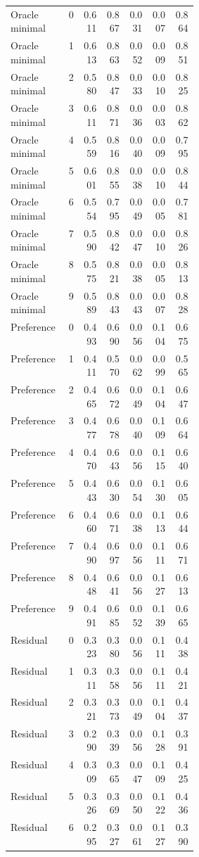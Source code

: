 \documentclass{article}
\begin{document}
\begin{center}
\begin{longtable}{p{0.31\linewidth}rrrrrr}
Oracle minimal & 0 & 0.611 & 0.867 & 0.031 & 0.007 & 0.864\\
Oracle minimal & 1 & 0.613 & 0.863 & 0.052 & 0.009 & 0.851\\
Oracle minimal & 2 & 0.580 & 0.847 & 0.033 & 0.010 & 0.825\\
Oracle minimal & 3 & 0.611 & 0.871 & 0.036 & 0.003 & 0.862\\
Oracle minimal & 4 & 0.559 & 0.816 & 0.040 & 0.009 & 0.795\\
Oracle minimal & 5 & 0.601 & 0.855 & 0.038 & 0.010 & 0.844\\
Oracle minimal & 6 & 0.554 & 0.795 & 0.049 & 0.005 & 0.781\\
Oracle minimal & 7 & 0.590 & 0.842 & 0.047 & 0.010 & 0.826\\
Oracle minimal & 8 & 0.575 & 0.821 & 0.038 & 0.005 & 0.813\\
Oracle minimal & 9 & 0.589 & 0.843 & 0.043 & 0.007 & 0.828\\
Preference & 0 & 0.493 & 0.690 & 0.056 & 0.104 & 0.675\\
Preference & 1 & 0.411 & 0.570 & 0.062 & 0.099 & 0.565\\
Preference & 2 & 0.465 & 0.672 & 0.049 & 0.104 & 0.647\\
Preference & 3 & 0.477 & 0.678 & 0.040 & 0.109 & 0.664\\
Preference & 4 & 0.470 & 0.643 & 0.056 & 0.115 & 0.640\\
Preference & 5 & 0.443 & 0.630 & 0.054 & 0.130 & 0.605\\
Preference & 6 & 0.460 & 0.671 & 0.038 & 0.113 & 0.644\\
Preference & 7 & 0.490 & 0.697 & 0.056 & 0.111 & 0.671\\
Preference & 8 & 0.448 & 0.641 & 0.056 & 0.127 & 0.613\\
Preference & 9 & 0.491 & 0.685 & 0.052 & 0.139 & 0.665\\
Residual & 0 & 0.323 & 0.380 & 0.056 & 0.111 & 0.438\\
Residual & 1 & 0.311 & 0.358 & 0.056 & 0.111 & 0.421\\
Residual & 2 & 0.321 & 0.373 & 0.049 & 0.104 & 0.437\\
Residual & 3 & 0.290 & 0.339 & 0.056 & 0.128 & 0.391\\
Residual & 4 & 0.309 & 0.365 & 0.047 & 0.109 & 0.425\\
Residual & 5 & 0.326 & 0.369 & 0.050 & 0.122 & 0.436\\
Residual & 6 & 0.295 & 0.327 & 0.061 & 0.127 & 0.390\\

\end{longtable}
\end{center}
\end{document}
